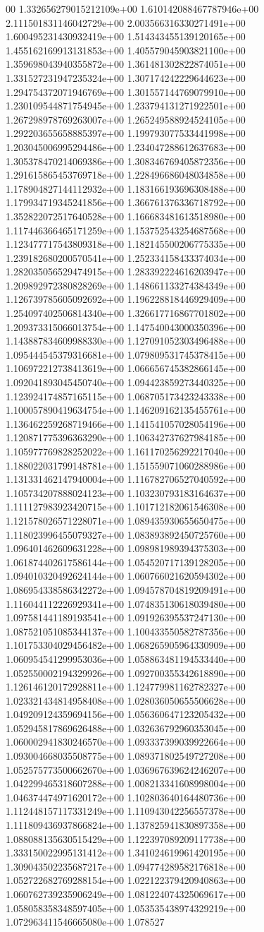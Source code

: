 00	1.332656279015212109e+00	1.610142088467787946e+00	2.111501831146042729e+00	2.003566316330271491e+00	1.600495231430932419e+00	1.514343455139120165e+00	1.455162169913131853e+00	1.405579045903821100e+00	1.359698043940355872e+00	1.361481302822874051e+00	1.331527231947235324e+00	1.307174242229644623e+00	1.294754372071946769e+00	1.301557144769079910e+00	1.230109544871754945e+00	1.233794131271922501e+00	1.267298978769263007e+00	1.265249588924524105e+00	1.292203655658885397e+00	1.199793077533441998e+00	1.203045006995294486e+00	1.234047288612637683e+00	1.305378470214069386e+00	1.308346769405872356e+00	1.291615865453769718e+00	1.228496686048034858e+00	1.178904827144112932e+00	1.183166193696308488e+00	1.179934719345241856e+00	1.366761376336718792e+00	1.352822072517640528e+00	1.166683481613518980e+00	1.117446366465171259e+00	1.153752543254687568e+00	1.123477717543809318e+00	1.182145500206775335e+00	1.239182680200570541e+00	1.252334158433374034e+00	1.282035056529474915e+00	1.283392224616203947e+00	1.209892972380828269e+00	1.148661133274384349e+00	1.126739785605092692e+00	1.196228818446929409e+00	1.254097402506814340e+00	1.326617716867701802e+00	1.209373315066013754e+00	1.147540043000350396e+00	1.143887834609988330e+00	1.127091052303496488e+00	1.095444545379316681e+00	1.079809531745378415e+00	1.106972212738413619e+00	1.066656745382866145e+00	1.092041893045450740e+00	1.094423859273440325e+00	1.123924174857165115e+00	1.068705173423243338e+00	1.100057890419634754e+00	1.146209162135455761e+00	1.136462259268719466e+00	1.141541057028054196e+00	1.120871775396363290e+00	1.106342737627984185e+00	1.105977769828252022e+00	1.161170256292217040e+00	1.188022031799148781e+00	1.151559071060288986e+00	1.131331462147940004e+00	1.116782706527040592e+00	1.105734207888024123e+00	1.103230793183164637e+00	1.111127983923420715e+00	1.101712182061546308e+00	1.121578026571228071e+00	1.089435930655650475e+00	1.118023996455079327e+00	1.083893892450725760e+00	1.096401462609631228e+00	1.098981989394375303e+00	1.061874402617586144e+00	1.054520717139128205e+00	1.094010320492624144e+00	1.060766021620594302e+00	1.086954338586342272e+00	1.094578704819209491e+00	1.116044112226929341e+00	1.074835130618039480e+00	1.097581441189193541e+00	1.091926395537247130e+00	1.087521051085344137e+00	1.100433550582787356e+00	1.101753304029456482e+00	1.068265905964330909e+00	1.060954541299953036e+00	1.058863481194533440e+00	1.052550002194329926e+00	1.092700355342618890e+00	1.126146120172928811e+00	1.124779981162782327e+00	1.023321434814958408e+00	1.028036050655506628e+00	1.049209124359694156e+00	1.056360647123205432e+00	1.052945817869626488e+00	1.032636792960353045e+00	1.060002941830246570e+00	1.093337399039922664e+00	1.093004668035508775e+00	1.089371802549727208e+00	1.052575773500662670e+00	1.036967639624246207e+00	1.042299465318607288e+00	1.008213341608998004e+00	1.046374474971620172e+00	1.102803640164480736e+00	1.112448157117331249e+00	1.110943042256557378e+00	1.111809436937866824e+00	1.137825941830897358e+00	1.088088135630515429e+00	1.122397089209117738e+00	1.333150022995131412e+00	1.341024619961420195e+00	1.309043502235687217e+00	1.094774289582176818e+00	1.052722682769288154e+00	1.022122379420940863e+00	1.060762739235906249e+00	1.081224074325069617e+00	1.058058358348597405e+00	1.053535438974329219e+00	1.072963411546665080e+00	1.078527